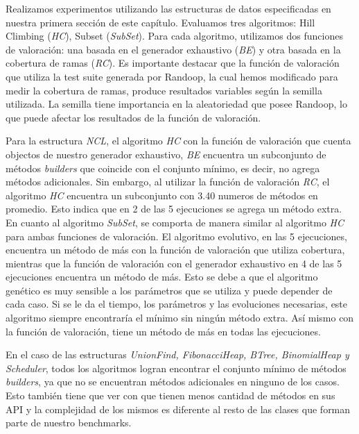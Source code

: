 Realizamos experimentos utilizando las estructuras de datos especificadas en nuestra primera sección de este capítulo. Evaluamos tres algoritmos: Hill Climbing (\emph{HC}), Subset (\emph{SubSet}). Para cada algoritmo, utilizamos dos funciones de valoración: una basada en el generador exhaustivo (\emph{BE}) y otra basada en la cobertura de ramas (\emph{RC}).
Es importante destacar que la función de valoración que utiliza la test suite generada por Randoop, la cual hemos modificado para medir la cobertura de ramas, produce resultados variables según la semilla utilizada. La semilla tiene importancia en la aleatoriedad que posee Randoop, lo que puede afectar los resultados de la función de valoración.

Para la estructura \emph{NCL}, el algoritmo \emph{HC} con la función de valoración que cuenta objectos de nuestro generador exhaustivo, \emph{BE} encuentra un subconjunto de métodos \emph{builders} que coincide con el conjunto mínimo, es decir, no agrega métodos adicionales. Sin embargo, al utilizar la función de valoración \emph{RC}, el algoritmo \emph{HC} encuentra un subconjunto con 3.40 numeros de métodos en promedio. Esto indica que en 2 de las 5 ejecuciones se agrega un método extra.
En cuanto al algoritmo \emph{SubSet}, se comporta de manera similar al algoritmo \emph{HC} para ambas funciones de valoración.
El algoritmo evolutivo, en las 5 ejecuciones, encuentra un método de más con la función de valoración que utiliza cobertura, mientras que la función de valoración con el generador exhaustivo en 4 de las 5 ejecuciones encuentra un método de más. Esto se debe a que el algoritmo genético es muy sensible a los parámetros que se utiliza y puede depender de cada caso. Si se le da el tiempo, los parámetros y las evoluciones necesarias, este algoritmo siempre encontraría el mínimo sin ningún método extra. Así mismo con la función de valoración, tiene un método de más en todas las ejecuciones.


En el caso de las estructuras \emph{UnionFind, FibonacciHeap, BTree, BinomialHeap y Scheduler}, todos los algoritmos logran encontrar el conjunto mínimo de métodos \emph{builders}, ya que no se encuentran métodos adicionales en ninguno de los casos. Esto también tiene que ver con que tienen menos cantidad de métodos en sus API y la complejidad de los mismos es diferente al resto de las clases que forman parte de nuestro benchmarks.

